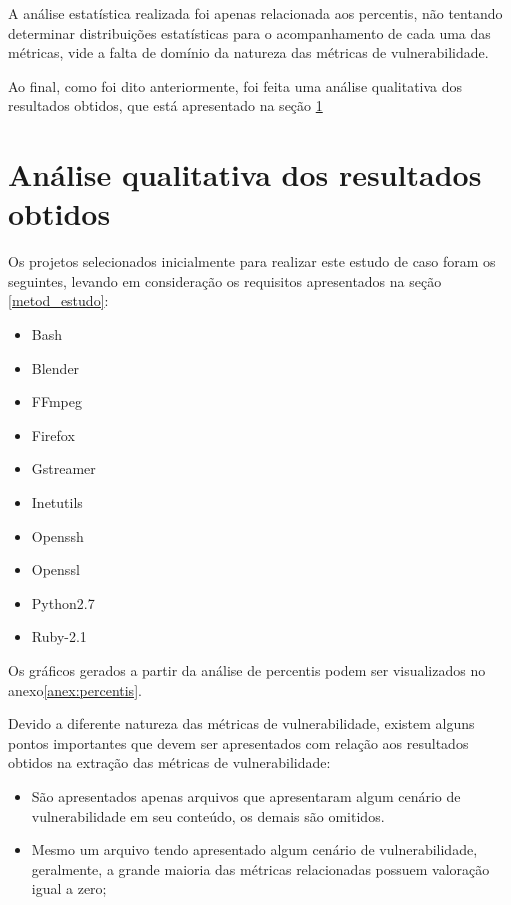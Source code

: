 A análise estatística realizada foi apenas relacionada aos percentis, não tentando determinar distribuições estatísticas para
o acompanhamento de cada uma das métricas, vide a falta de domínio da natureza das métricas de vulnerabilidade.

Ao final, como foi dito anteriormente, foi feita uma análise qualitativa dos resultados obtidos, que está apresentado na seção
\ref{analise_estudo}

\section{Análise qualitativa dos resultados obtidos} \label{analise_estudo}

Os projetos selecionados inicialmente para realizar este estudo de caso foram os seguintes, levando em consideração os 
requisitos apresentados na seção \ref{metod_estudo}:

\begin{multicols}{2}
  \begin{itemize}
    \item Bash
    \item Blender
    \item FFmpeg
    \item Firefox
    \item Gstreamer
    \item Inetutils
    \item Openssh
    \item Openssl
    \item Python2.7
    \item Ruby-2.1
  \end{itemize}
\end{multicols}

Os gráficos gerados a partir da análise de percentis podem ser visualizados
no anexo\ref{anex:percentis}.

Devido a diferente natureza das métricas de vulnerabilidade, existem alguns pontos importantes que devem ser apresentados com
relação aos resultados obtidos na extração das métricas de vulnerabilidade:

\begin{itemize}
  \item São apresentados apenas arquivos que apresentaram algum cenário de vulnerabilidade em seu conteúdo, os demais são
    omitidos.
  \item Mesmo um arquivo tendo apresentado algum cenário de vulnerabilidade, geralmente, a grande maioria das métricas 
    relacionadas possuem valoração igual a zero;
\end{itemize}

